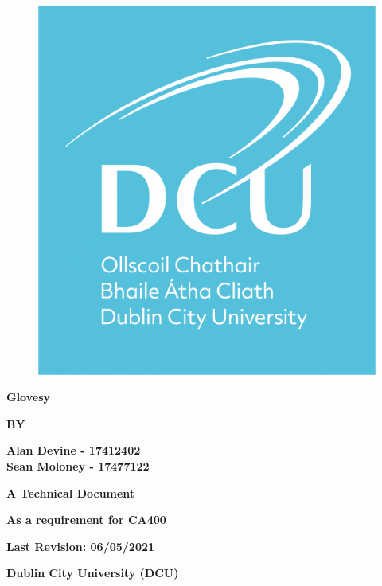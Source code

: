 \documentclass[12pt,a4paper,oneside]{book}
\theoremstyle{plain}
\numberwithin{equation}{chapter}
\begin{document}
\thispagestyle{empty}

\begin{figure}[h!]
\vskip1in
\begin{center}
\includegraphics[width = 3.5 cm]{DCU_logo_square.png}
\end{center}
\end{figure}

\begin{center}
\large\textbf{Glovesy}
\end{center}

\vskip2.5cm

\begin{center}
\textbf{BY}
\end{center}

\vskip0.6cm

\begin{center}
\textbf{Alan Devine - 17412402}\\
\textbf{Sean Moloney - 17477122}
\end{center}

\vskip3cm

\begin{center}
\textbf{A Technical Document}
\end{center}

\begin{center}
\textbf{As a requirement for CA400}
\end{center}
\vskip2cm

\begin{center}
\textbf{Last Revision: 06/05/2021}
\end{center}

\begin{center}
\textbf{Dublin City University (DCU)}
\end{center}
\end{document}
